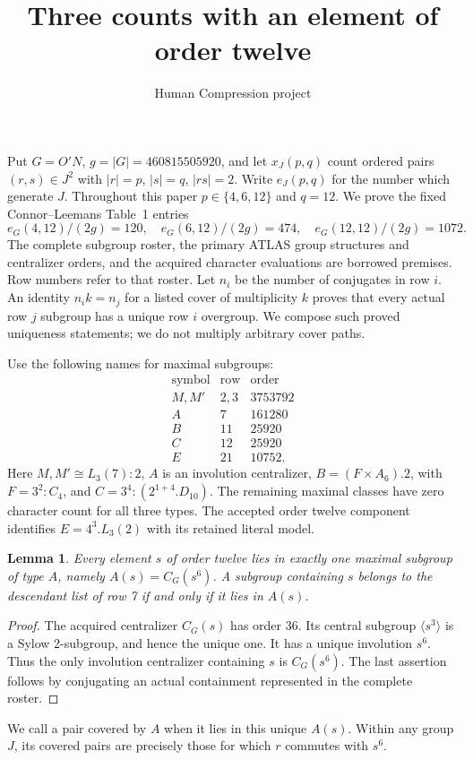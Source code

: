 \documentclass[11pt,a4paper]{article}
\title{Three counts with an element of order twelve}
\author{Human Compression project}\date{}
\newtheorem{lemma}{Lemma}\newtheorem{theorem}{Theorem}
\begin{document}
\maketitle
Put $G=O'N$, $g=|G|=460815505920$, and let $x_J(p,q)$ count ordered
pairs $(r,s)\in J^2$ with $|r|=p$, $|s|=q$, $|rs|=2$. Write
$e_J(p,q)$ for the number which generate $J$. Throughout this paper
$p\in\{4,6,12\}$ and $q=12$. We prove the fixed Connor--Leemans
Table~1 entries
\[
 e_G(4,12)/(2g)=120,\quad e_G(6,12)/(2g)=474,\quad
 e_G(12,12)/(2g)=1072.                                      \tag{1}
\]
The complete subgroup roster, the primary ATLAS group structures and
centralizer orders, and the acquired character evaluations are borrowed
premises. Row numbers refer to that roster. Let $n_i$ be the number of
conjugates in row $i$. An identity $n_i k=n_j$ for a listed cover of
multiplicity $k$ proves that every actual row $j$ subgroup has a unique
row $i$ overgroup. We compose such proved uniqueness statements; we do
not multiply arbitrary cover paths.

Use the following names for maximal subgroups:
\[
\begin{array}{c|c|r}
\text{symbol}&\text{row}&\text{order}\\\hline
M,M'&2,3&3753792\\ A&7&161280\\
B&11&25920\\ C&12&25920\\ E&21&10752.
\end{array}                                                \tag{2}
\]
Here $M,M'\cong L_3(7):2$, $A$ is an involution centralizer,
$B=(F\times A_6).2$, with $F=3^2:C_4$, and
$C=3^4:(2^{1+4}.D_{10})$. The remaining maximal classes have zero
character count for all three types. The accepted order twelve component
identifies $E=4^3.L_3(2)$ with its retained literal model.

\begin{lemma}\label{distinguished}
Every element $s$ of order twelve lies in exactly one maximal subgroup
of type $A$, namely $A(s)=C_G(s^6)$. A subgroup containing $s$ belongs
to the descendant list of row 7 if and only if it lies in $A(s)$.
\end{lemma}
\begin{proof}
The acquired centralizer $C_G(s)$ has order 36. Its central subgroup
$\langle s^3\rangle$ is a Sylow 2-subgroup, and hence the unique one.
It has a unique involution $s^6$. Thus the only involution centralizer
containing $s$ is $C_G(s^6)$. The last assertion follows by conjugating
an actual containment represented in the complete roster.
\end{proof}
We call a pair covered by $A$ when it lies in this unique $A(s)$.
Within any group $J$, its covered pairs are precisely those for which
$r$ commutes with $s^6$.
\end{document}
